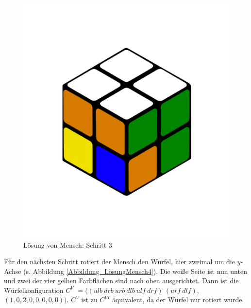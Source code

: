 \documentclass[12pt,a4paper, usenames, dvipsnames]{article}
\theoremstyle{mystyle}
\theoremstyle{definition}
\begin{document}
\begin{figure}[H]
\centering
\includegraphics[scale=0.12]{menschSchritt3.png}
\caption[Lösung von Mensch: Schritt 3]{Lösung von Mensch: Schritt 3}
\label{Abbildung_LösungMensch3}
\end{figure} 

Für den nächsten Schritt rotiert der Mensch den Würfel, hier zweimal um die $y$-Achse (s. Abbildung \ref{Abbildung_LösungMensch4}). Die weiße Seite ist nun unten und zwei der vier gelben Farbflächen sind nach oben ausgerichtet. Dann ist die Würfelkonfiguration $C^V $ $= (( \textit{ulb} \ \textit{drb} \ \textit{urb} \ \textit{dlb} \ \textit{ulf} \ \textit{drf} ) \ ( \textit{urf} \ \textit{dlf} ),$ $(1,0,2,0,0,0,0,0))$. $C^V$ ist zu $C^{VI}$ äquivalent, da der Würfel nur rotiert wurde.
\end{document}
